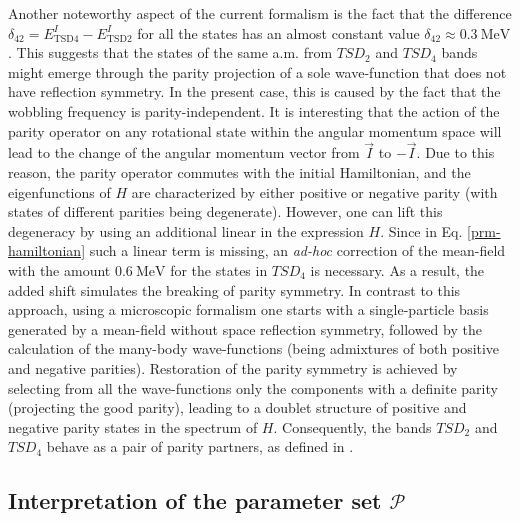 \documentclass[myclassdoc,debug]{rjparticle}
\begin{document}
Another noteworthy aspect of the current formalism is the fact that the difference $\delta_{42}=E_\text{TSD4}^I-E_\text{TSD2}^I$ for all the states has an almost constant value $\delta_{42}\approx0.3\ \text{MeV}$. This suggests that the states of the same a.m. from $TSD_2$ and $TSD_4$ bands might emerge through the parity projection of a sole wave-function that does not have reflection symmetry. In the present case, this is caused by the fact that the wobbling frequency is parity-independent. It is interesting that the action of the parity operator on any rotational state within the angular momentum space will lead to the change of the angular momentum vector from $\vec{I}$ to $-\vec{I}$. Due to this reason, the parity operator commutes with the initial Hamiltonian, and the eigenfunctions of $H$ are characterized by either positive or negative parity (with states of different parities being degenerate). However, one can lift this degeneracy by using an additional linear in the expression $H$. Since in Eq. \ref{prm-hamiltonian} such a linear term is missing, an \emph{ad-hoc} correction of the mean-field with the amount $0.6\ \text{MeV}$ for the states in $TSD_4$ is necessary. As a result, the added shift simulates the breaking of parity symmetry. In contrast to this approach, using a microscopic formalism one starts with a single-particle basis generated by a mean-field without space reflection symmetry, followed by the calculation of the many-body wave-functions (being admixtures of both positive and negative parities). Restoration of the parity symmetry is achieved by selecting from all the wave-functions only the components with a definite parity (projecting the good parity), leading to a doublet structure of positive and negative parity states in the spectrum of $H$. Consequently, the bands $TSD_2$ and $TSD_4$ behave as a pair of parity partners, as defined in \cite{chasman1980incipient,raduta2006description,raduta2006simultaneous}.

\subsection{\texorpdfstring{Interpretation of the parameter set $\mathcal{P}$}%
                               {Interpretation of the parameter set P}}\label{results:interpret}
\end{document}
